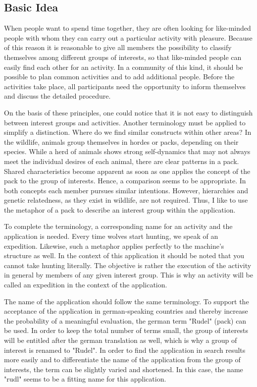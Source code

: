 \documentclass[12pt,numbers=noenddot,parskip,bibliography=totocnumbered,listof=totocnumbered,draft]{scrreprt}
\begin{document}
\subsection{Basic Idea}
When people want to spend time together, they are often looking for like-minded people with whom they can carry out a particular activity with pleasure. Because of this reason it is reasonable to give all members the possibility to classify themselves among different groups of interests, so that like-minded people can easily find each other for an activity. In a community of this kind, it should be possible to plan common activities and to add additional people. Before the activities take place, all participants need the opportunity to inform themselves and discuss the detailed procedure. 

On the basis of these principles, one could notice that it is not easy to distinguish between interest groups and activities. Another terminology must be applied to simplify a distinction. Where do we find similar constructs within other areas? In the wildlife, animals group themselves in hordes or packs, depending on their species. While a herd of animals shows strong self-dynamics that may not always meet the individual desires of each animal, there are clear patterns in a pack. Shared characteristics become apparent as soon as one applies the concept of the pack to the group of interests. Hence, a comparison seems to be appropriate. In both concepts each member pursues similar intentions. However, hierarchies and genetic relatedness, as they exist in wildlife, are not required. Thus, I like to use the metaphor of a pack to describe an interest group within the application.

To complete the terminology, a corresponding name for an activity and the application is needed. Every time wolves start hunting, we speak of an expedition. Likewise, such a metaphor applies perfectly to the machine's structure as well. In the context of this application it should be noted that you cannot take hunting literally. The objective is rather the execution of the activity in general by members of any given interest group. This is why an activity will be called an expedition in the context of the application. 

The name of the application should follow the same terminology. To support the acceptance of the application in german-speaking countries and thereby increase the probability of a meaningful evaluation, the german term "Rudel" (pack) can be used. In order to keep the total number of terms small, the group of interests will be entitled after the german translation as well, which is why a group of interest is renamed to "Rudel". In order to find the application in search results more easily and to differentiate the name of the application from the group of interests, the term can be slightly varied and shortened. In this case, the name "rudl" seems to be a fitting name for this application.
\end{document}
